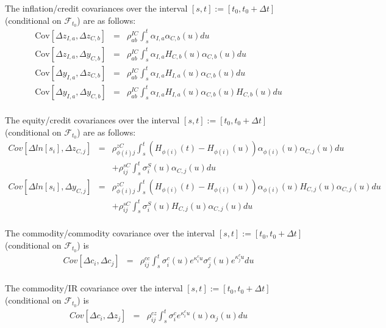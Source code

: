 The inflation/credit covariances over the interval $[s,t] := [t_0, t_0+\Delta t]$ (conditional on $\mathcal{F}_{t_0}$) are as follows:
\begin{eqnarray*}
  \mathrm{Cov}[ \Delta z_{I,a}, \Delta z_{C,b} ] &=&
  \rho_{ab}^{IC}\int_s^t \alpha_{I,a} \alpha_{C,b}(u) du\\
  \mathrm{Cov}[ \Delta z_{I,a}, \Delta y_{C,b} ] &=&
  \rho_{ab}^{IC}\int_s^t \alpha_{I,a} H_{C,b}(u) \alpha_{C,b}(u) du\\
  \mathrm{Cov}[ \Delta y_{I,a}, \Delta z_{C,b} ] &=&
  \rho_{ab}^{IC}\int_s^t \alpha_{I,a} H_{I,a}(u) \alpha_{C,b}(u) du\\
  \mathrm{Cov}[ \Delta y_{I,a}, \Delta y_{C,b} ] &=&
  \rho_{ab}^{IC}\int_s^t \alpha_{I,a} H_{I,a}(u) \alpha_{C,b}(u) H_{C,b}(u) du\\
\end{eqnarray*}

The equity/credit covariances over the interval $[s,t] := [t_0, t_0+\Delta t]$ (conditional on $\mathcal{F}_{t_0}$) are as follows:
\begin{eqnarray*}
	Cov \left[\Delta ln[s_i], \Delta z_{C,j} \right] &=&
	\rho_{\phi(i)j}^{zC} \int_s^t (H_{\phi(i)} (t) - H_{\phi(i)} (u)) \alpha_{\phi(i)} (u) \alpha_{C,j} (u) du\\
	&&+ \rho_{ij}^{sC} \int_s^t \sigma_i^S (u) \alpha_{C,j} (u) du\\	
	Cov \left[\Delta ln[s_i], \Delta y_{C,j} \right] &=&
	\rho_{\phi(i)j}^{zC} \int_s^t (H_{\phi(i)} (t) - H_{\phi(i)} (u)) \alpha_{\phi(i)} (u) H_{C,j} (u) \alpha_{C,j} (u) du\\
	&&+ \rho_{ij}^{sC} \int_s^t \sigma_i^S (u) H_{C,j} (u) \alpha_{C,j} (u) du\\
\end{eqnarray*}


The commodity/commodity covariance over the interval $[s,t] := [t_0, t_0+\Delta t]$ (conditional on $\mathcal{F}_{t_0}$) is
\begin{eqnarray*}
	Cov \left[\Delta c_i, \Delta c_j \right] &=& \rho_{ij}^{cc} \int_s^t \sigma_i^c(u) e^{\kappa^c_i u } \sigma_j^c(u) e^{\kappa^c_j u } du\\
\end{eqnarray*}

The commodity/IR covariance over the interval $[s,t] := [t_0, t_0+\Delta t]$ (conditional on $\mathcal{F}_{t_0}$) is
\begin{eqnarray*}
	Cov \left[\Delta c_i, \Delta z_j \right] &=& \rho_{ij}^{cz} \int_s^t \sigma_i^c e^{\kappa^c_i u} (u) \alpha_j (u) du\\
\end{eqnarray*}

